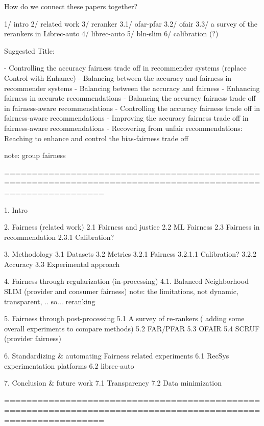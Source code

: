 
How do we connect these papers together?

1/ intro
2/ related work
3/ reranker
    3.1/ ofar-pfar
    3.2/ ofair
    3.3/ a survey of the rerankers in Librec-auto
4/ librec-auto
5/ bln-slim
6/ calibration (?)



Suggested Title: 

- Controlling the accuracy fairness trade off in recommender systems (replace Control with Enhance)
- Balancing between the accuracy and fairness in recommender systems
- Balancing between the accuracy and fairness
- Enhancing fairness in accurate recommendations
- Balancing the accuracy fairness trade off in fairness-aware recommendations
- Controlling the accuracy fairness trade off in fairness-aware recommendations
- Improving the accuracy fairness trade off in fairness-aware recommendations
- Recovering from unfair recommendations: Reaching to enhance and control the bias-fairness trade off


note: group fairness

==============================================================================================================

1. Intro

2. Fairness (related work)
    2.1 Fairness and justice
    2.2 ML Fairness
    2.3 Fairness in recommendation
        2.3.1 Calibration?
    
3. Methodology
    3.1 Datasets
    3.2 Metrics
        3.2.1 Fairness
            3.2.1.1 Calibration?
        3.2.2 Accuracy
    3.3 Experimental approach

4. Fairness through regularization (in-processing)
    4.1. Balanced Neighborhood SLIM
    (provider and consumer fairness)
    note: the limitations, not dynamic, transparent, .. so... reranking
    
5. Fairness through post-processing
    5.1 A survey of re-rankers ( adding some overall experiments to compare methods)
    5.2 FAR/PFAR
    5.3 OFAIR
    5.4 SCRUF
    (provider fairness)

6. Standardizing & automating Fairness related experiments
    6.1 RecSys experimentation platforms
    6.2 librec-auto

7. Conclusion & future work
    7.1 Transparency
    7.2 Data minimization


==============================================================================================================






    







